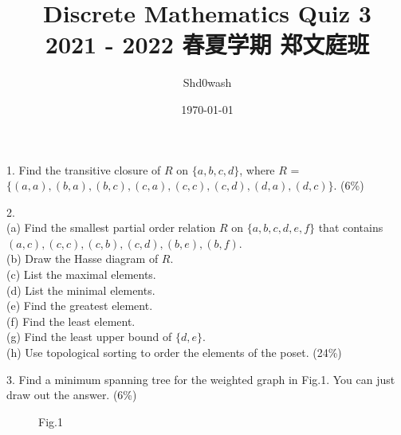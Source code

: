 \documentclass{article}
\title{Discrete Mathematics Quiz 3\\\small{2021 - 2022 \enspace 春夏学期 \enspace 郑文庭班}}
\author{Shd0wash}
\date{\today}
\begin{document}
\maketitle

1. Find the transitive closure of $\mathit{R}$ on $\{a, b, c, d\}$, where $\mathit{R}$ = $\{(a, a), (b, a), (b, c), (c, a), (c, c), (c, d), (d, a), (d, c)\}$. (6\%)  

2.\\
(a) Find the smallest partial order relation $\mathit{R}$ on $\{a, b, c, d, e, f\}$ that contains $(a, c), (c, c), (c, b), (c, d), (b, e), (b, f)$.\\
(b) Draw the Hasse diagram of $\mathit{R}$.\\
(c) List the maximal elements.\\
(d) List the minimal elements.\\ 
(e) Find the greatest element.\\
(f) Find the least element.\\
(g) Find the least upper bound of $\{d, e\}$.\\
(h) Use topological sorting to order the elements of the poset. (24\%)  

3. Find a minimum spanning tree for the weighted graph in Fig.1. You can just draw out the answer. (6\%)  

\begin{figure}[htbp]
    \centering
    \caption{Fig.1}
\end{figure}
\end{document}
